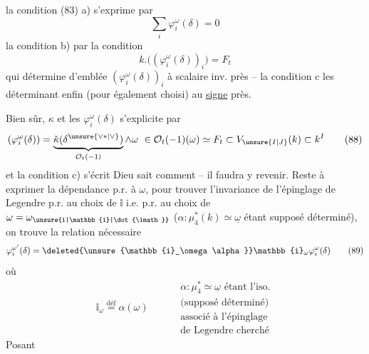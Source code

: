 la condition (83) a) s'exprime par
\[
 \sum_i\varphi_i^\omega(\delta)=0 \tag*{(86)}
\]
la condition b) par la condition
\[
 k.\big((\varphi_i^\omega(\delta))_i\big)=F_t \tag*{(87)}
\]
qui détermine d'emblée  $(\varphi_i^\omega(\delta))_i$ à scalaire inv. près -- la condition c les déterminant enfin (pour  également choisi) au \uline{signe} près.

Bien sûr,   $\kappa$ et les $\varphi_i^\omega(\delta)$ s'explicite par
\[
 (\varphi_i^\omega(\delta))=\underbrace{\check\kappa(\delta^{\unsure{\vee*|\vee}})}_{\mathcal O_t(-1)}\wedge\omega
 \ \in\mathcal O_t(-1)(\omega)\simeq F_t\subset V_{\unsure{I|J}}(k)\subset k^I \tag*{(88)}
\]
et la condition c) s'écrit Dieu sait comment -- il faudra  y revenir. Reste à exprimer la dépendance p.r. à $\omega$, pour  trouver l'invariance de l'épinglage de Legendre p.r. au choix de $\mathbb{i}$ i.e. p.r. au choix de $\omega=\omega_{\unsure{i|\mathbb{i}|\dot{\imath}}}$ ($\alpha:\mu_4^*(k)\simeq\underline\omega$ étant supposé déterminé), on trouve la relation nécessaire
\[
 \varphi_i^{\omega'}(\delta)=\deleted{\unsure{\mathbb{i}_\omega\alpha}}\mathbb{i}_\omega\varphi_i^\omega(\delta) \tag*{(89)}
\]
où
\[
 \mathbb{i}_\omega\overset{\text{déf}}=\alpha(\omega)\qquad
 \begin{aligned}
 &\alpha:\mu_4^*\simeq\underline\omega\text{ étant l'iso.}\\
 &\text{(supposé déterminé)}\\
 &\text{associé à l'épinglage}\\
 &\text{de Legendre cherché}
 \end{aligned}
\]
Posant
